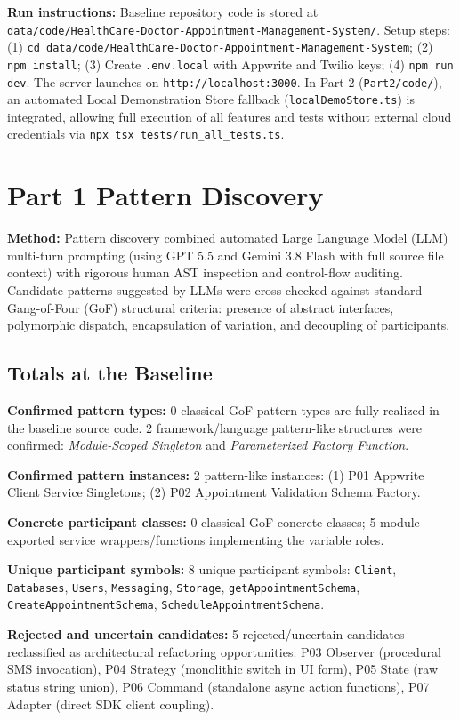 \documentclass[11pt,a4paper]{article}
\newcommand{\entry}[2]{\textbf{#1:} #2\par}
\begin{document}
\entry{Run instructions}{Baseline repository code is stored at \texttt{data/code/HealthCare-Doctor-Appointment-Management-System/}. Setup steps: (1) \texttt{cd data/code/HealthCare-Doctor-Appointment-Management-System}; (2) \texttt{npm install}; (3) Create \texttt{.env.local} with Appwrite and Twilio keys; (4) \texttt{npm run dev}. The server launches on \texttt{http://localhost:3000}. In Part 2 (\texttt{Part2/code/}), an automated Local Demonstration Store fallback (\texttt{localDemoStore.ts}) is integrated, allowing full execution of all features and tests without external cloud credentials via \texttt{npx tsx tests/run\_all\_tests.ts}.}

\section{Part 1 Pattern Discovery}

\entry{Method}{Pattern discovery combined automated Large Language Model (LLM) multi-turn prompting (using GPT 5.5 and Gemini 3.8 Flash with full source file context) with rigorous human AST inspection and control-flow auditing. Candidate patterns suggested by LLMs were cross-checked against standard Gang-of-Four (GoF) structural criteria: presence of abstract interfaces, polymorphic dispatch, encapsulation of variation, and decoupling of participants.}

\subsection{Totals at the Baseline}

\entry{Confirmed pattern types}{0 classical GoF pattern types are fully realized in the baseline source code. 2 framework/language pattern-like structures were confirmed: \textit{Module-Scoped Singleton} and \textit{Parameterized Factory Function}.}
\entry{Confirmed pattern instances}{2 pattern-like instances: (1) P01 Appwrite Client Service Singletons; (2) P02 Appointment Validation Schema Factory.}
\entry{Concrete participant classes}{0 classical GoF concrete classes; 5 module-exported service wrappers/functions implementing the variable roles.}
\entry{Unique participant symbols}{8 unique participant symbols: \texttt{Client}, \texttt{Databases}, \texttt{Users}, \texttt{Messaging}, \texttt{Storage}, \texttt{getAppointmentSchema}, \texttt{CreateAppointmentSchema}, \texttt{ScheduleAppointmentSchema}.}
\entry{Rejected and uncertain candidates}{5 rejected/uncertain candidates reclassified as architectural refactoring opportunities: P03 Observer (procedural SMS invocation), P04 Strategy (monolithic switch in UI form), P05 State (raw status string union), P06 Command (standalone async action functions), P07 Adapter (direct SDK client coupling).}
\end{document}
